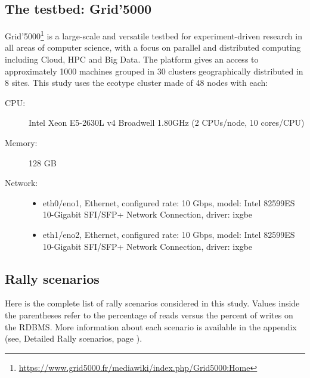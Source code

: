 \subsection{The testbed: Grid'5000}
Grid’5000\footnote{\url{https://www.grid5000.fr/mediawiki/index.php/Grid5000:Home}} is a large-scale and versatile testbed for experiment-driven research in all areas of computer science, with a focus on parallel and distributed computing including Cloud, HPC and Big Data. The platform gives an access to approximately 1000 machines grouped in 30 clusters geographically distributed in 8 sites. This study uses the ecotype cluster made of 48 nodes with each:

\begin{description}
    \item[CPU:] Intel Xeon E5-2630L v4 Broadwell 1.80GHz (2 CPUs/node, 10 cores/CPU)
    \item[Memory:] 128 GB
    \item[Network:]      \begin{itemize}
        \item eth0/eno1, Ethernet, configured rate: 10 Gbps, model: Intel 82599ES 10-Gigabit SFI/SFP+ Network Connection, driver: ixgbe
        \item eth1/eno2, Ethernet, configured rate: 10 Gbps, model: Intel 82599ES 10-Gigabit SFI/SFP+ Network Connection, driver: ixgbe
      \end{itemize}
\end{description}

\subsection{Rally scenarios}
\label{rally-scenarios}
Here is the complete list of rally scenarios considered in this study. Values inside the parentheses refer to the percentage of reads versus the percent of writes on the RDBMS. More information about each scenario is available in the appendix (see, Detailed Rally scenarios, page \pageref{sec:detail-rally}).

